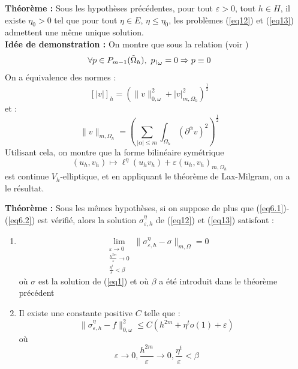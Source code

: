 \documentclass[final]{beamer}
\def\restriction#1#2{\mathchoice
              {\setbox1\hbox{${\displaystyle #1}_{\scriptstyle #2}$}
              \restrictionaux{#1}{#2}}
              {\setbox1\hbox{${\textstyle #1}_{\scriptstyle #2}$}
              \restrictionaux{#1}{#2}}
              {\setbox1\hbox{${\scriptstyle #1}_{\scriptscriptstyle #2}$}
              \restrictionaux{#1}{#2}}
              {\setbox1\hbox{${\scriptscriptstyle #1}_{\scriptscriptstyle #2}$}
              \restrictionaux{#1}{#2}}}
\def\restrictionaux#1#2{{#1\,\smash{\vrule height .8\ht1 depth .85\dp1}}_{\,#2}}
\newlength{\sepwid}
\newlength{\onecolwid}
\begin{document}
\begin{frame}[t]
\begin{columns}[t] 

\begin{column}{\sepwid}\end{column} 

\begin{column}{\onecolwid} 
\begin{block}{}
\textbf{Théorème :}
Sous les hypothèses précédentes, pour tout $\varepsilon>0$, tout $h\in H$, il existe $\eta_0>0$ tel que pour tout $\eta\in E$, $\eta\leq\eta_0$, les problèmes (\ref{eq12}) et (\ref{eq13}) admettent une même unique solution.\\
\textbf{Idée de demonstration :} On montre que sous la relation (voir \cite{necas67mthd})
	\[\forall p\in P_{m-1}(\tilde{\Omega}_h),\ \restriction{p}{\omega}=0\Rightarrow p\equiv 0\]
On a équivalence des normes :
	\[[|v|]_h=\left(\|v\|^2_{0,\omega}+|v|_{m,\Omega_h}^2\right)^\frac{1}{2}\]
et :
	\[\|v\|_{m,\Omega_h}=\left( \sum_{|\alpha|\leq m} \int_{\Omega_h} (\partial^\alpha v)^2\right)^\frac{1}{2}\]
Utilisant cela, on montre que la forme bilinéaire symétrique
	\[(u_h,v_h)\mapsto \ell^\eta(u_hv_h)+\varepsilon (u_h,v_h)_{m,\Omega_h}\]
est continue $V_h$-elliptique, et en appliquant le théorème de Lax-Milgram, on a le résultat.

\textbf{Théorème :}
Sous les mêmes hypothèses, si on suppose de plus que (\ref{eq6.1})-(\ref{eq6.2}) est vérifié, alors la solution $\sigma_{\varepsilon,h}^\eta$ de (\ref{eq12}) et (\ref{eq13}) satisfont :
\begin{enumerate}
	\item \[\lim_{\substack{\varepsilon\to 0\\ \frac{h^{2m}}{\varepsilon}\to 0 \\ \frac{\eta^t}{\varepsilon}<\beta}} \|\sigma^\eta_{\varepsilon, h}-\sigma\|_{m,\Omega}=0\]
où $\sigma$ est la solution de (\ref{eq1}) et où $\beta$ a été introduit dans le théorème précédent
	\item Il existe une constante positive $C$ telle que :
		\[\|\sigma_{\varepsilon, h}^\eta - f\|_{0,\omega}^2\leq C\left(h^{2m}+\eta^t o(1)+\varepsilon\right)\]
où \[\varepsilon\to 0, \frac{h^{2m}}{\varepsilon}\to 0, \frac{\eta^t}{\varepsilon}<\beta\]
\end{enumerate}


\end{block}
\end{column}
\end{columns}
\end{frame}
\end{document}
